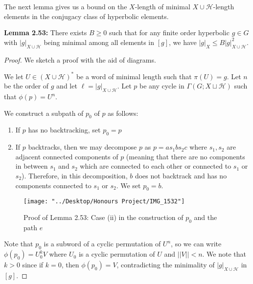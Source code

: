 \documentclass[12pt]{article}
\newcommand{\vs}{\vskip10pt}
\begin{document}
	The next lemma gives us a bound on the $X$-length of minimal $X \cup \mathcal{H}$-length elements in the conjugacy class of hyperbolic elements. 
	
	\vs 
	
	\textbf{Lemma 2.53: } There exists $B \geq 0$ such that for any finite order hyperbolic $g \in G$ with $\vert g \vert_{X \cup \mathcal{H}}$ being minimal among all elements in $[g]$, we have $\vert g \vert_X \leq B \vert g \vert_{X \cup \mathcal{H}}^2$. 
	
	\begin{proof}
		
		We sketch a proof with the aid of diagrams. 
		
		\vs 
		
		We let $U \in (X \cup \mathcal{H})^*$ be a word of minimal length such that $\pi(U) = g$. Let $n$ be the order of $g$ and let $\ell = \vert g \vert_{X \cup \mathcal{H}}$. Let $p$ be any cycle in $\Gamma(G; X \sqcup \mathcal{H})$ such that $\phi(p) = U^n$. 
		
		\vs 
		
		We construct a subpath of $p_0$ of $p$ as follows: 
		
		\begin{enumerate}[label = (\roman*)]
			\item If $p$ has no backtracking, set $p_0 = p$
			\item If $p$ backtracks, then we may decompose $p$ as $p = a s_1 b s_2 c$ where $s_1, s_2$ are adjacent connected components of $p$ (meaning that there are no components in between $s_1$ and $s_2$ which are connected to each other or connected to $s_1$ or $s_2$). Therefore, in this decomposition, $b$ does not backtrack and has no components connected to $s_1$ or $s_2$. We set $p_0 = b$. 
		\end{enumerate}
		
\begin{figure} [H]
	\centering
	\texttt{[image: "../Desktop/Honours Project/IMG\_1532"]}
	\caption{Proof of Lemma 2.53: Case (ii) in the construction of $p_0$ and the path $e$}
	\label{fig:img1532}
\end{figure}
		
		\vs
		
		Note that $p_0$ is a subword of a cyclic permutation of $U^n$, so we can write $\phi(p_0) = U_0^k V$ where $U_0$ is a cyclic permutation of $U$ and $\vert \vert V \vert \vert < n$. We note that $k > 0$ since if $k = 0$, then $\phi(p_0) = V$, contradicting the minimality of $\vert g \vert_{X \cup \mathcal{H}}$ in $[g]$. 
		

\end{proof}
\end{document}

